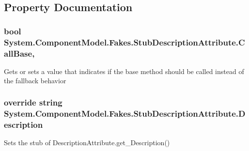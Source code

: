 \subsection{Property Documentation}
\hypertarget{class_system_1_1_component_model_1_1_fakes_1_1_stub_description_attribute_ac6869213778b74a36d650c1a6c6b0c2f}{
\subsubsection[{Call\-Base}]{\setlength{\rightskip}{0pt plus 5cm}bool System.\-Component\-Model.\-Fakes.\-Stub\-Description\-Attribute.\-Call\-Base\hspace{0.3cm}{\ttfamily [get]}, {\ttfamily [set]}}}\label{class_system_1_1_component_model_1_1_fakes_1_1_stub_description_attribute_ac6869213778b74a36d650c1a6c6b0c2f}


Gets or sets a value that indicates if the base method should be called instead of the fallback behavior

\hypertarget{class_system_1_1_component_model_1_1_fakes_1_1_stub_description_attribute_ad78787d59f940242bb7e7165a26fc890}{
\subsubsection[{Description}]{\setlength{\rightskip}{0pt plus 5cm}override string System.\-Component\-Model.\-Fakes.\-Stub\-Description\-Attribute.\-Description\hspace{0.3cm}{\ttfamily [get]}}}\label{class_system_1_1_component_model_1_1_fakes_1_1_stub_description_attribute_ad78787d59f940242bb7e7165a26fc890}


Sets the stub of Description\-Attribute.\-get\-\_\-\-Description()

